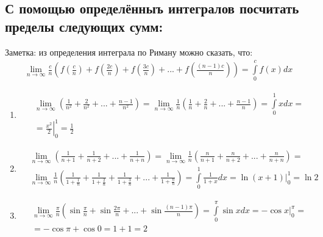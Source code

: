 \documentclass[a4paper, 12pt]{article}
\begin{document}
\subsection{С помощью определённыъ интегралов посчитать пределы следующих сумм:}
Заметка: из определения интеграла по Риману можно сказать, что:
\begin{align*}
 \lim_{n \to \infty}\frac{c}{n}\left( f\left(\frac{c}{n}\right) + 
 f\left(\frac{2c}{n}\right) + f\left(\frac{3c}{n}\right) + ... +
 f\left(\frac{(n-1)c}{n}\right) \right) = 
 \int\limits_0^c f(x)dx
\end{align*}

\begin{enumerate}
 \item %
 \begin{align*}
   &\lim_{n \to \infty} \left(
   \frac{1}{n^2}+\frac{2}{n^2}+...+\frac{n-1}{n^2} \right) = 
   \lim_{n \to \infty} \frac{1}{n} \left(
   \frac{1}{n}+\frac{2}{n}+...+\frac{n-1}{n} \right) = 
   \int\limits_0^1 x dx = \\
   &=\left. \frac{x^2}{2} \right|_0^1 = \frac{1}{2}
 \end{align*}
 
 \item %
 \begin{align*}
    &\lim\limits_{n \to \infty}\left(\frac{1}{n+1}+\frac{1}{n+2}+\text{...}+\frac{1}{n+n}\right) = 
    \lim\limits_{n \to \infty}\frac{1}{n}\left(\frac{n}{n+1}+\frac{n}{n+2}+\text{...}+\frac{n}{n+n}\right) = \\
    &\lim\limits_{n \to \infty}\frac{1}{n}\left(\frac{1}{1+\frac{1}{n}}+\frac{1}{1+\frac{2}{n}}+\frac{1}{1+\frac{3}{n}}+\text{...}+\frac{1}{1+\frac{n}{n}}\right) = 
    \int\limits_0^1\frac{1}{1+x}dx = \ln{(x+1)} \Big|_0^1 = \ln2
    \end{align*}
 
 \item %
 \begin{align*}
  &\lim_{n\to\infty} \frac{\pi}{n}\left(
  \sin \frac{\pi}{n} + \sin \frac{2\pi}{n} +...+\sin\frac{(n-1)\pi}{n} \right) = 
  \int\limits_0^\pi \sin x dx  = -\cos x \Big|_0^\pi = \\
  &= -\cos \pi + \cos 0 = 1+1=2
 \end{align*}
\end{enumerate}
\end{document}
